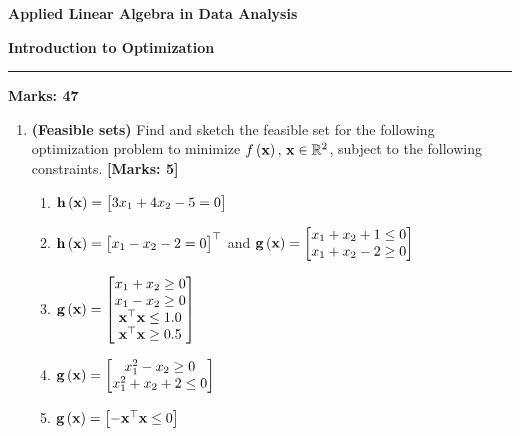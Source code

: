 \documentclass[12pt]{article}
\def\mf{\ensuremath\mathbf}
\def\mb{\ensuremath\mathbb}
\def\lp{\ensuremath\left(}
\def\rp{\ensuremath\right)}
\def\bmx{\ensuremath\begin{bmatrix*}[r]}
\def\emx{\ensuremath\end{bmatrix*}}
\def\bmxc{\ensuremath\begin{bmatrix*}[c]}
\newcommand{\ct}[1]{\lp #1\rp}
\begin{document}
\begin{center}
\begin{large}
\textbf{Applied Linear Algebra in Data Analysis}\\
\vspace{0.1cm}
\end{large}
\textbf{Introduction to Optimization}
\end{center}
\hrule
\vspace{1em}

\begin{large}
    \textbf{Marks: 47}
\end{large}


\begin{enumerate}
    \item \textbf{(Feasible sets)} Find and sketch the feasible set for the following optimization problem to minimize $f\ct{\mf{x}}, \, \mf{x} \in \mb{R}^2$, subject to the following constraints. \textbf{[Marks: 5]}
    \begin{enumerate}
        \item $\mf{h}\ct{\mf{x}} = \bmx 3x_1 + 4x_2 - 5 = 0\emx$
        \item $\mf{h}\ct{\mf{x}} = \bmx x_1 - x_2 - 2 = 0\emx^\top$ and $\mf{g}\ct{\mf{x}} = \bmx x_1 + x_2 + 1 \leq 0 \\ x_1 + x_2 - 2 \geq 0 \emx$
        \item $\mf{g}\ct{\mf{x}} = \bmxc x_1 + x_2 \geq 0 \\ x_1 - x_2 \geq 0 \\ \mf{x}^\top\mf{x} \leq 1.0 \\ \mf{x}^\top\mf{x} \geq 0.5\emx$
        \item $\mf{g}\ct{\mf{x}} = \bmxc x_1^2 - x_2 \geq 0 \\ x_1^2 + x_2 + 2 \leq 0 \emx$
        \item $\mf{g}\ct{\mf{x}} = \bmxc -\mf{x}^\top\mf{x} \leq 0 \emx$
    \end{enumerate}


\end{enumerate}
\end{document}
